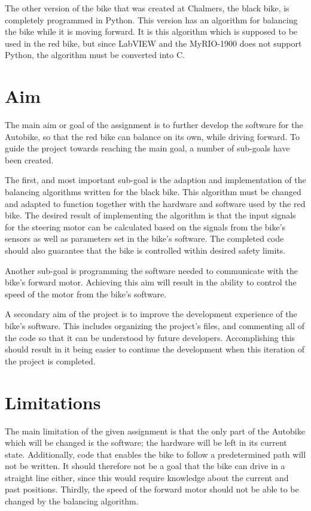 The other version of the bike that was created at Chalmers, the black bike, is completely programmed in Python. This version has an algorithm for balancing the bike while it is moving forward. It is this algorithm which is supposed to be used in the red bike, but since LabVIEW and the MyRIO-1900 does not support Python, the algorithm must be converted into C.

\section{Aim} \label{intro:aim}

The main aim or goal of the assignment is to further develop the software for the Autobike, so that the red bike can balance on its own, while driving forward. To guide the project towards reaching the main goal, a number of sub-goals have been created.

The first, and most important sub-goal is the adaption and implementation of the balancing algorithms written for the black bike. This algorithm must be changed and adapted to function together with the hardware and software used by the red bike. The desired result of implementing the algorithm is that the input signals for the steering motor can be calculated based on the signals from the bike's sensors as well as parameters set in the bike's software. The completed code should also guarantee that the bike is controlled within desired safety limits.

Another sub-goal is programming the software needed to communicate with the bike's forward motor. Achieving this aim will result in the ability to control the speed of the motor from the bike's software.

A secondary aim of the project is to improve the development experience of the bike's software. This includes organizing the project's files, and commenting all of the code so that it can be understood by future developers. Accomplishing this should result in it being easier to continue the development when this iteration of the project is completed.

\section{Limitations}

The main limitation of the given assignment is that the only part of the Autobike which will be changed is the software; the hardware will be left in its current state. Additionally, code that enables the bike to follow a predetermined path will not be written. It should therefore not be a goal that the bike can drive in a straight line either, since this would require knowledge about the current and past positions. Thirdly, the speed of the forward motor should not be able to be changed by the balancing algorithm.
